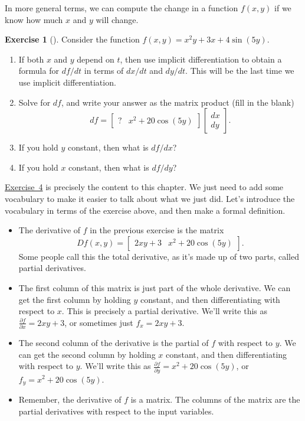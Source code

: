 \documentclass[10pt,]{book}
\theoremstyle{plain}
\theoremstyle{definition}
\theoremstyle{definition}
\theoremstyle{definition}
\theoremstyle{definition}
\newtheorem{exploration}[project]{Exercise}
\theoremstyle{definition}
\numberwithin{equation}{section}
\newcommand{\amp}{&}
\begin{document}
In more general terms, we can compute the change in a function \(f(x,y)\) if we know how much \(x\) and \(y\) will change.%
\begin{exploration}[]\label{unit6_content}
Consider the function \(f(x,y) = x^2y +3x+4\sin(5y)\).%
\begin{enumerate}[font=\bfseries,label=(\alph*),ref=\alph*]
\item\label{task-279} If both \(x\) and \(y\) depend on \(t\), then use implicit differentiation to obtain a formula for \(df/dt\) in terms of \(dx/dt\) and \(dy/dt\). This will be the last time we use implicit differentiation.%
\item\label{task-280} Solve for \(df\), and write your answer as the matrix product (fill in the blank)%
\begin{equation*}
df = \begin{bmatrix}?\amp  x^2+20\cos(5y)
\end{bmatrix} \begin{bmatrix}dx\\dy
\end{bmatrix} .
\end{equation*}
%
\item\label{task-281} If you hold \(y\) constant, then what is \(df/dx\)?%
\item\label{task-282} If you hold \(x\) constant, then what is \(df/dy\)?%
\end{enumerate}
\end{exploration}
\hyperref[unit6_content]{Exercise~4} is precisely the content to this chapter. We just need to add some vocabulary to make it easier to talk about what we just did. Let's introduce the vocabulary in terms of the exercise above, and then make a formal definition. \leavevmode%
\begin{itemize}[label=\textbullet]
\item{}The derivative of \(f\) in the previous exercise is the matrix%
\begin{equation*}
Df(x,y) = \begin{bmatrix}2xy+3\amp  
x^2+20\cos(5y)
\end{bmatrix} .
\end{equation*}
Some people call this the total derivative, as it's made up of two parts, called partial derivatives.%
\item{}The first column of this matrix is just part of the whole derivative. We can get the first column by holding \(y\) constant, and then differentiating with respect to \(x\). This is precisely a partial derivative.  We'll write this as \(\frac{\partial f}{\partial x} = 2xy+3\), or sometimes just \(f_x = 2xy+3\).%
\item{}The second column of the derivative is the partial of \(f\) with respect to \(y\). We can get the second column by holding \(x\) constant, and then differentiating with respect to \(y\). We'll write this as \(\frac{\partial f}{\partial y} = x^2+20\cos(5y)\), or \(f_y = x^2+20\cos(5y)\).%
\item{}Remember, the derivative of \(f\) is a matrix. The columns of the matrix are the partial derivatives with respect to the input variables.%
\end{itemize}
\end{document}
